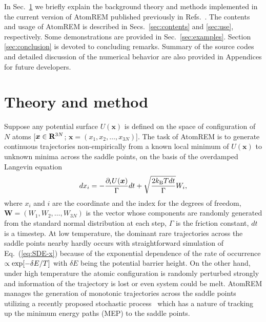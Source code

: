 \documentclass[preprint,12pt]{elsarticle}
\begin{document}
In Sec.~\ref{sec:theory} we briefly explain the background theory and methods implemented in the current version of AtomREM published previously in Refs.~\cite{Akashi, Nagornov}. The contents and usage of AtomREM is described in Secs.~\ref{sec:contents} and \ref{sec:use}, respectively. Some demonstrations are provided in Sec.~\ref{sec:examples}. Section \ref{sec:conclusion} is devoted to concluding remarks. Summary of the source codes and detailed discussion of the numerical behavior are also provided in Appendices for future developers.


\section{Theory and method}
\label{sec:theory}
Suppose any potential surface $U({\bm x})$ is defined on the space of configuration of $N$ atoms [${\bm x}\in {\bf R}^{3N}$; ${\bm x}=(x_{1}, x_{2}, \dots, x_{3N})$]. The task of AtomREM is to generate continuous trajectories non-empirically from a known local minimum of $U({\bm x})$ to unknown minima across the saddle points, on the basis of the overdamped Langevin equation
\begin{eqnarray}
dx_{i} =  -\frac{\partial_{i} U({\bm x})}{\Gamma} dt+ \sqrt{\frac{2k_{\rm B} Tdt}{\Gamma}}W_{i}
,
\label{eq:SDE-x}
\end{eqnarray}
where $x_i$ and $i$ are the coordinate and the index for the degrees of freedom,
${\bm W}=(W_{1}, W_{2}, \dots, W_{3N})$ is the vector whose components are randomly generated from the standard normal distribution at each step, 
$\Gamma$ is the friction constant,
$dt$ is a timestep. At low temperature, the dominant rare trajectories across the saddle points nearby hardly occurs with straightforward simulation of Eq.~(\ref{eq:SDE-x}) because of the exponential dependence of the rate of occurrence $\propto {\rm exp}[-\delta E/T]$ with $\delta E$ being the potential barrier height. On the other hand, under high temperature the atomic configuration is randomly perturbed strongly and information of the trajectory is lost or even system could be melt. AtomREM manages the generation of monotonic trajectories across the saddle points utilizing a recently proposed stochastic process~\cite{Akashi, Nagornov} which has a nature of tracking up the minimum energy paths (MEP) to the saddle points. 
\end{document}
